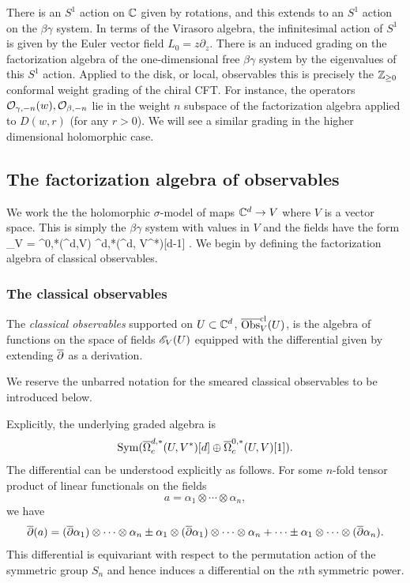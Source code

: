 \documentclass[10pt]{amsart}
\def\Bar{\overline}
\begin{document}
There is an $S^1$ action on $\mathbb C$ given by rotations, and this extends to an $S^1$ action on the $\beta\gamma$ system.
In terms of the Virasoro algebra, the infinitesimal action of $S^1$ is given by the Euler vector field $L_0 = z \partial_z$. 
There is an induced grading on the factorization algebra of the one-dimensional free $\beta\gamma$ system by the eigenvalues of this $S^1$ action.
Applied to the disk, or local, observables this is precisely the $\mathbb Z_{\geq 0}$ conformal weight grading of the chiral CFT.
For instance, the operators $\mathcal O_{\gamma,-n}(w), \mathcal O_{\beta, -n}$ lie in the weight $n$ subspace of the factorization algebra applied to $D(w,r)$ (for any $r >0$). 
We will see a similar grading in the higher dimensional holomorphic case.

\subsection{The factorization algebra of observables}

We work the the holomorphic $\sigma$-model of maps $\mathbb C^d \to V$ where $V$ is a vector space.
This is simply the $\beta\gamma$ system with values in $V$ and the fields have the form
\ben
\sE_V = \Omega^{0,*}(\CC^d,V) \oplus \Omega^{d,*}(\CC^d, V^*)[d-1] .
\een
We begin by defining the factorization algebra of classical observables.

\subsubsection{The classical observables}

\begin{dfn}
The \emph{classical observables} supported on $U \subset \mathbb C^d$, $\overline{{\rm Obs}}^{{\rm cl}}_V(U)$, is the algebra of functions on the space of fields $\mathscr E_V(U)$ equipped with the differential given by extending $\dbar$ as a derivation.
\end{dfn}

\begin{rmk}
We reserve the unbarred notation for the smeared classical observables to be introduced below.
\end{rmk}

Explicitly, the underlying graded algebra is
\[
\Sym(\Bar{\Omega}^{d,*}_c(U,V^*)[d] \oplus \Bar{\Omega}^{0,*}_c(U,V)[1]).
\]
The differential can be understood explicitly as follows.
For some $n$-fold tensor product of linear functionals on the fields
\[
a = \alpha_1 \otimes \cdots \otimes \alpha_n,
\]
we have
\[
\dbar(a) = (\dbar \alpha_1) \otimes \cdots \otimes \alpha_n \pm \alpha_1 \otimes (\dbar \alpha_1) \otimes \cdots \otimes \alpha_n + \cdots \pm\alpha_1 \otimes \cdots \otimes (\dbar \alpha_n).
\]
This differential is equivariant with respect to the permutation action of the symmetric group $S_n$ and 
hence induces a differential on the $n$th symmetric power.
\end{document}

